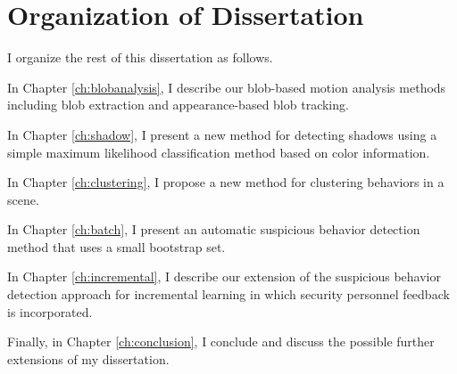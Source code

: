 \section{Organization of Dissertation}

I organize the rest of this dissertation as follows.

In Chapter \ref{ch:blobanalysis}, I describe our blob-based motion
analysis methods including blob extraction and appearance-based blob
tracking.

In Chapter \ref{ch:shadow}, I present a new method for detecting
shadows using a simple maximum likelihood classification method based
on color information.

In Chapter \ref{ch:clustering}, I propose a new method for clustering
behaviors in a scene.

In Chapter \ref{ch:batch}, I present an automatic suspicious behavior
detection method that uses a small bootstrap set.

In Chapter \ref{ch:incremental}, I describe our extension of the
suspicious behavior detection approach for incremental learning in
which security personnel feedback is incorporated.

Finally, in Chapter \ref{ch:conclusion}, I conclude and discuss the
possible further extensions of my dissertation.

\FloatBarrier







